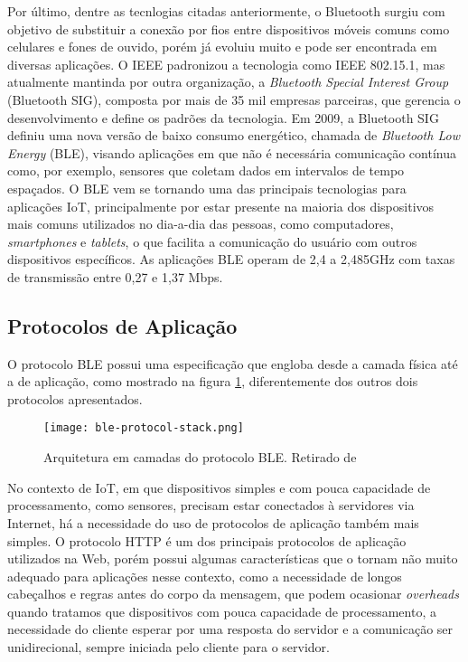 \documentclass[../monografia.tex]{subfiles}
\begin{document}
Por último, dentre as tecnlogias citadas anteriormente, o Bluetooth surgiu com objetivo de substituir a conexão por fios entre dispositivos móveis comuns como celulares e fones de ouvido, porém já evoluiu muito e pode ser encontrada em diversas aplicações. O IEEE padronizou a tecnologia como IEEE 802.15.1, mas atualmente mantinda por outra organização, a \textit{Bluetooth Special Interest Group} (Bluetooth SIG), composta por mais de 35 mil empresas parceiras, que gerencia o desenvolvimento e define os padrões da tecnologia. Em 2009, a Bluetooth SIG definiu uma nova versão de baixo consumo energético, chamada de \textit{Bluetooth Low Energy} (BLE), visando aplicações em que não é necessária comunicação contínua como, por exemplo, sensores que coletam dados em intervalos de tempo espaçados. O BLE vem se tornando uma das principais tecnologias para aplicações IoT, principalmente por estar presente na maioria dos dispositivos mais comuns utilizados no dia-a-dia das pessoas, como computadores, \textit{smartphones} e \textit{tablets}, o que facilita a comunicação do usuário com outros dispositivos específicos. As aplicações BLE operam de 2,4 a 2,485GHz com taxas de transmissão entre 0,27 e 1,37 Mbps\cite{ble-datarate}. 

\subsection{Protocolos de Aplicação}

O protocolo BLE possui uma especificação que engloba desde a camada física até a de aplicação, como mostrado na figura \ref{fig:ble-stack}, diferentemente dos outros dois protocolos apresentados. 

\begin{figure}[h]
\centering
\texttt{[image: ble-protocol-stack.png]}
\caption{Arquitetura em camadas do protocolo BLE. Retirado de \cite{ble-protocol-stack}}
\label{fig:ble-stack}
\end{figure}

No contexto de IoT, em que dispositivos simples e com pouca capacidade de processamento, como sensores, precisam estar conectados à servidores via Internet, há a necessidade do uso  de protocolos de aplicação também mais simples. O protocolo HTTP é um dos principais protocolos de aplicação utilizados na Web, porém possui algumas características que o tornam não muito adequado para aplicações nesse contexto, como a necessidade de longos cabeçalhos e regras antes do corpo da mensagem, que podem ocasionar \textit{overheads} quando tratamos que dispositivos com pouca capacidade de processamento, a necessidade do cliente esperar por uma resposta do servidor e a comunicação ser unidirecional, sempre iniciada pelo cliente para o servidor.
\end{document}
